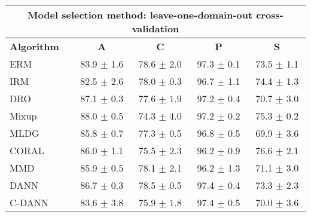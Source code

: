 \documentclass{article}
\begin{document}
\begin{center}
\begin{tabular}{lcccc}
\toprule
\multicolumn{5}{c}{\textbf{Model selection method: leave-one-domain-out cross-validation}} \\
\midrule
\textbf{Algorithm}    & \textbf{A}                & \textbf{C}                & \textbf{P}                & \textbf{S}                \\
\midrule
ERM                       & 83.9 $\pm$ 1.6            & 78.6 $\pm$ 2.0            & 97.3 $\pm$ 0.1            & 73.5 $\pm$ 1.1            \\
IRM                       & 82.5 $\pm$ 2.6            & 78.0 $\pm$ 0.3            & 96.7 $\pm$ 1.1            & 74.4 $\pm$ 1.3            \\
DRO                 & 87.1 $\pm$ 0.3            & 77.6 $\pm$ 1.9            & 97.2 $\pm$ 0.4            & 70.7 $\pm$ 3.0            \\
Mixup                     & 88.0 $\pm$ 0.5            & 74.3 $\pm$ 4.0            & 97.2 $\pm$ 0.2            & 75.3 $\pm$ 0.2            \\
MLDG                      & 85.8 $\pm$ 0.7            & 77.3 $\pm$ 0.5            & 96.8 $\pm$ 0.5            & 69.9 $\pm$ 3.6            \\
CORAL                     & 86.0 $\pm$ 1.1            & 75.5 $\pm$ 2.3            & 96.2 $\pm$ 0.9            & 76.6 $\pm$ 2.1            \\
MMD                       & 85.9 $\pm$ 0.5            & 78.1 $\pm$ 2.1            & 96.2 $\pm$ 1.3            & 71.1 $\pm$ 3.0            \\
DANN                       & 86.7 $\pm$ 0.3            & 78.5 $\pm$ 0.5            & 97.4 $\pm$ 0.4            & 73.3 $\pm$ 2.3            \\
C-DANN                   & 83.6 $\pm$ 3.8            & 75.9 $\pm$ 1.8            & 97.4 $\pm$ 0.5            & 70.0 $\pm$ 3.6            \\
\bottomrule
\end{tabular}
\end{center}
\end{document}
